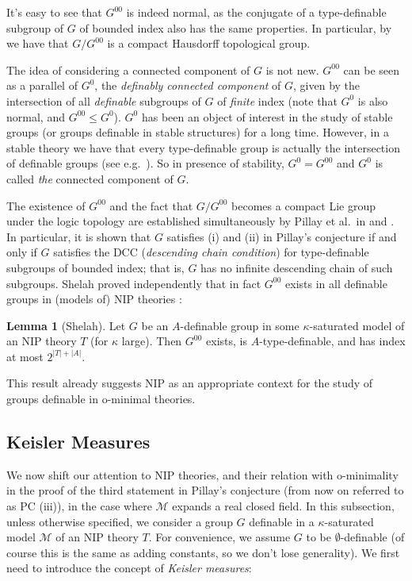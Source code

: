 \documentclass[a4paper]{report}
\newcommand{\ind}{\hspace{15pt}}
\newcommand{\M}{\mathcal{M}}
\theoremstyle{definition}
\newtheorem{lem}[thm]{Lemma}
\theoremstyle{remstyle}
\begin{document}
\ind It's easy to see that $G^{00}$ is indeed normal, as the conjugate of a type-definable subgroup of $G$ of bounded index also has the same properties. In particular, by  we have that $G/G^{00}$ is a compact Hausdorff topological group.

\ind The idea of considering a connected component of $G$ is not new. $G^{00}$ can be seen as a parallel of $G^0$, the \emph{definably connected component} of $G$, given by the intersection of all \emph{definable} subgroups of $G$ of \emph{finite} index (note that $G^0$ is also normal, and $G^{00}\leq G^0$). $G^0$ has been an object of interest in the study of stable groups (or groups definable in stable structures) for a long time. However, in a stable theory we have that every type-definable group is actually the intersection of definable groups (see e.g.\ \cite{stable groups 2}). So in presence of stability, $G^0=G^{00}$ and $G^0$ is called \emph{the} connected component of $G$.

\ind The existence of $G^{00}$ and the fact that $G/G^{00}$ becomes a compact Lie group under the logic topology are established simultaneously by Pillay et al.\ in \cite{typedef} and \cite{desc chain con}. In particular, it is shown that $G$ satisfies (i) and (ii) in Pillay's conjecture if and only if $G$ satisfies the DCC (\emph{descending chain condition}) for type-definable subgroups of bounded index; that is, $G$ has no infinite descending chain of such subgroups. Shelah proved independently that in fact $G^{00}$ exists in all definable groups in (models of) NIP theories \cite{min bounded}:

\begin{lem}[Shelah]
	Let $G$ be an $A$-definable group in some $\kappa$-saturated model of an NIP theory $T$ (for $\kappa$ large). Then $G^{00}$ exists, is $A$-type-definable, and has index at most $2^{|T|+|A|}$.
\end{lem}

\ind This result already suggests NIP as an appropriate context for the study of groups definable in o-minimal theories.

\subsection{Keisler Measures}

\ind We now shift our attention to NIP theories, and their relation with o-minimality in the proof of the third statement in Pillay's conjecture (from now on referred to as PC (iii)), in the case where $\M$ expands a real closed field. In this subsection, unless otherwise specified, we consider a group $G$ definable in a $\kappa$-saturated model $\M$ of an NIP theory $T$. For convenience, we assume $G$ to be $\emptyset$-definable (of course this is the same as adding constants, so we don't lose generality). We first need to introduce the concept of \emph{Keisler measures}:
\end{document}
